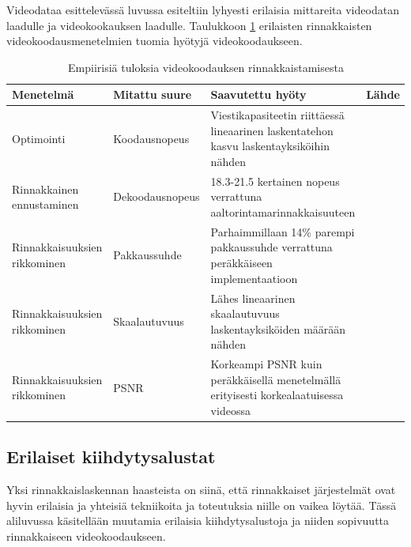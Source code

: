 Videodataa esittelevässä luvussa esiteltiin lyhyesti erilaisia mittareita videodatan
laadulle ja videokookauksen laadulle. Taulukkoon \ref{tab:results}
erilaisten rinnakkaisten videokoodausmenetelmien tuomia hyötyjä
videokoodaukseen.
\begin{center}

\begin{longtable}{| p{} | p{}| p{}| p{}|}

	\caption{Empiirisiä tuloksia videokoodauksen rinnakkaistamisesta}
	\label{tab:results}\\
	\hline
	Menetelmä & Mitattu suure & Saavutettu hyöty & Lähde \\
	\hline\hline
	Optimointi & Koodausnopeus & Viestikapasiteetin riittäessä lineaarinen laskentatehon kasvu laskentayksiköihin nähden &
			\citealt{li} \\
	\hline
	Rinnakkainen ennustaminen & Dekoodausnopeus &
			18.3-21.5 kertainen nopeus verrattuna aaltorintamarinnakkaisuuteen & \citealt{pieters} \\
	\hline
	Rinnakkaisuuksien rikkominen & Pakkaussuhde & Parhaimmillaan 14\% parempi pakkaussuhde verrattuna
			peräkkäiseen implementaatioon & \citealt{xu} \\
	\hline
	Rinnakkaisuuksien rikkominen & Skaalautuvuus & Lähes lineaarinen skaalautuvuus laskentayksiköiden määrään nähden &
			\citealt{xu} \\
	\hline
	Rinnakkaisuuksien rikkominen & PSNR & Korkeampi PSNR kuin peräkkäisellä menetelmällä erityisesti korkealaatuisessa videossa &
			\citealt{xu} \\
	\hline 
\end{longtable}
\end{center}
\subsection{Erilaiset kiihdytysalustat}

Yksi rinnakkaislaskennan haasteista on siinä, että rinnakkaiset järjestelmät
ovat hyvin erilaisia ja yhteisiä tekniikoita ja toteutuksia niille on vaikea
löytää. Tässä aliluvussa käsitellään muutamia erilaisia kiihdytysalustoja ja
niiden sopivuutta rinnakkaiseen videokoodaukseen.


